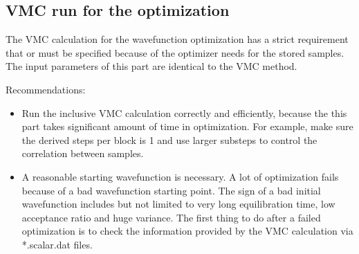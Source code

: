 \subsection{VMC run for the optimization}
The VMC calculation for the wavefunction optimization has a strict requirement 
that  or  must be specified because of the optimizer needs for the stored samples.
The input parameters of this part are identical to the VMC method.

Recommendations:
\begin{itemize}
\item Run the inclusive VMC calculation correctly and efficiently, because the this part takes significant amount of time in optimization.
For example, make sure the derived steps per block is 1 and use larger substeps to control the correlation between samples.
\item A reasonable starting wavefunction is necessary. A lot of optimization fails because of a bad wavefunction starting point.
The sign of a bad initial wavefunction includes but not limited to very long equilibration time, low acceptance ratio and huge variance.
The first thing to do after a failed optimization is to check the information provided by the VMC calculation via *.scalar.dat files.
\end{itemize}


